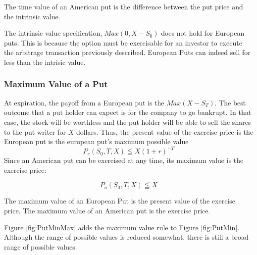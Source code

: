 \documentclass{book}
\theoremstyle{definition}
\theoremstyle{remark}
\begin{document}
        \begin{tcolorbox}[colback=blue!5!white,colframe=blue!75!black, title=Sticky Note]
            The time value of an American put is the difference between the put price and the intrinsic value. 
        \end{tcolorbox}            
            
            The intrinsic value specification, $Max(0, X - S_0)$ does not hold for European puts. This is because the option must be exercisable for an investor to execute the arbitrage transaction previously described. European Puts can indeed sell for less than the intrisic value. 
            
        \subsubsection{Maximum Value of a Put}
            At expiration, the payoff from a European put is the $Max(X - S_T)$. The best outcome that a put holder can expect is for the company to go bankrupt. In that case, the stock will be worthless and the put holder will be able to sell the shares to the put writer for $X$ dollars. Thus, the present value of the exercise price is the European put is the european put's maximum possible value 
                \begin{equation}
                    P_e(S_0, T, X) \leqq X(1+r)^{-T}
                \end{equation}
            Since an American put can be exercised at any time, its maximum value is the exercise price: 
                
                \begin{equation}
                    P_a(S_0,T,X) \leqq X
                \end{equation}
                
            
        \begin{tcolorbox}[colback=blue!5!white,colframe=blue!75!black, title=Sticky Note]
            The maximum value of an European Put is the present value of the exercise price. The maximum value of an American put is the exercise price. 
        \end{tcolorbox}             
            
            Figure \ref{fig:PutMinMax} adds the maximum value rule to Figure \ref{fig:PutMin}. Although the range of possible values is reduced somewhat, there is still a broad range of possible values. 
            
\end{document}
